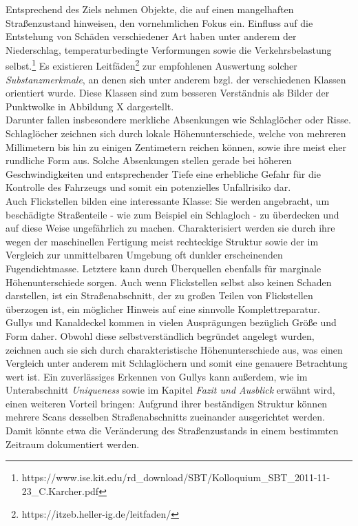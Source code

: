 Entsprechend des Ziels nehmen Objekte, die auf einen mangelhaften Straßenzustand hinweisen, den vornehmlichen Fokus ein. Einfluss auf die Entstehung von Schäden verschiedener Art haben unter anderem der Niederschlag, temperaturbedingte Verformungen sowie die Verkehrsbelastung selbst.\footnote{https://www.ise.kit.edu/rd\_download/SBT/Kolloquium\_SBT\_2011-11-23\_C.Karcher.pdf} Es existieren Leitfäden\footnote{https://itzeb.heller-ig.de/leitfaden/} zur empfohlenen Auswertung solcher \textit{Substanzmerkmale}, an denen sich unter anderem bzgl. der verschiedenen Klassen orientiert wurde. Diese Klassen sind zum besseren Verständnis als Bilder der Punktwolke in Abbildung X dargestellt. \\
Darunter fallen insbesondere merkliche Absenkungen wie Schlaglöcher oder Risse. Schlaglöcher zeichnen sich durch lokale Höhenunterschiede, welche von mehreren Millimetern bis hin zu einigen Zentimetern reichen können, sowie ihre meist eher rundliche Form aus. Solche Absenkungen stellen gerade bei höheren Geschwindigkeiten und entsprechender Tiefe eine erhebliche Gefahr für die Kontrolle des Fahrzeugs und somit ein potenzielles Unfallrisiko dar. \\
Auch Flickstellen bilden eine interessante Klasse: Sie werden angebracht, um beschädigte Straßenteile - wie zum Beispiel ein Schlagloch - zu überdecken und auf diese Weise ungefährlich zu machen. Charakterisiert werden sie durch ihre wegen der maschinellen Fertigung meist rechteckige Struktur sowie der im Vergleich zur unmittelbaren Umgebung oft dunkler erscheinenden Fugendichtmasse. Letztere kann durch Überquellen ebenfalls für marginale Höhenunterschiede sorgen. Auch wenn Flickstellen selbst also keinen Schaden darstellen, ist ein Straßenabschnitt, der zu großen Teilen von Flickstellen überzogen ist, ein möglicher Hinweis auf eine sinnvolle Komplettreparatur. \\
Gullys und Kanaldeckel kommen in vielen Ausprägungen bezüglich Größe und Form daher. Obwohl diese selbstverständlich begründet angelegt wurden, zeichnen auch sie sich durch charakteristische Höhenunterschiede aus, was einen Vergleich unter anderem mit Schlaglöchern und somit eine genauere Betrachtung wert ist. Ein zuverlässiges Erkennen von Gullys kann außerdem, wie im Unterabschnitt \textit{Uniqueness} sowie im Kapitel \textit{Fazit und Ausblick} erwähnt wird, einen weiteren Vorteil bringen: Aufgrund ihrer beständigen Struktur können mehrere Scans desselben Straßenabschnitts zueinander ausgerichtet werden. Damit könnte etwa die Veränderung des Straßenzustands in einem bestimmten Zeitraum dokumentiert werden. \\
